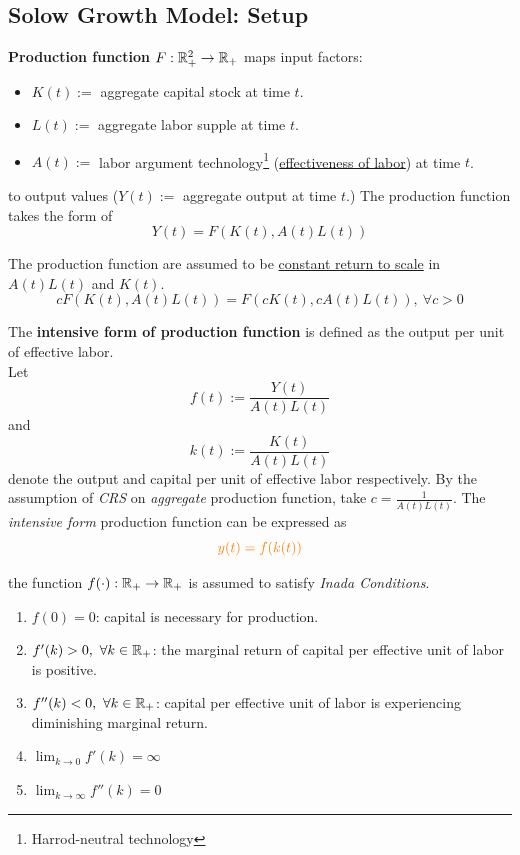 \documentclass[]{article}
\begin{document}
		\subsection{Solow Growth Model: Setup}
			\begin{definition}
				\textbf{Production function} $F: \mathbb{R}^2_{+} \rightarrow \mathbb{R}_+$ maps input factors:
				\begin{itemize}
					\item $K(t) := $ aggregate capital stock at time $t$.
					\item $L(t) := $ aggregate labor supple at time $t$.
					\item $A(t) := $ labor argument technology\footnote{Harrod-neutral technology} (\ul{effectiveness of labor}) at time $t$.
				\end{itemize} 
				to output values ($Y(t) := $ aggregate output at time $t$.) The production function takes the form of
				\[
					Y(t) = F(K(t), A(t)L(t))
				\]
			\end{definition}
			
			\begin{assumption}
				The production function are assumed to be \ul{constant return to scale} in $A(t)L(t)$ and $K(t)$.
				\[
					cF(K(t), A(t)L(t)) = F(cK(t), cA(t)L(t)),\ \forall c > 0
				\]
			\end{assumption}
			
			\begin{definition}
				The \textbf{intensive form of production function} is defined as the output per unit of effective labor. \\
				Let 
				\[
					f(t) := \frac{Y(t)}{A(t)L(t)}
				\] 
				and 
				\[
					k(t) := \frac{K(t)}{A(t)L(t)}
				\] denote the output and capital per unit of effective labor respectively. By the assumption of \emph{CRS} on \emph{aggregate} production function, take $c = \frac{1}{A(t)L(t)}$. The \emph{intensive form} production function can be expressed as
				\begin{equation}
					\textcolor{orange}{
						y(t) = f(k(t))
					}
				\end{equation}
			\end{definition}
			
			\begin{assumption} the function $f(\cdot): \mathbb{R}_+ \rightarrow \mathbb{R}_+$ is assumed to satisfy \emph{Inada Conditions}.
				\begin{enumerate}
					\item $f(0) = 0$: capital is necessary for production.
					\item $f'(k) > 0,\ \forall k \in \mathbb{R}_+$: the marginal return of capital per effective unit of labor is positive.
					\item $f''(k) < 0,\ \forall k \in \mathbb{R}_+$: capital per effective unit of labor is experiencing diminishing marginal return.
					\item $\lim_{k \to 0}f'(k) = \infty$
					\item $\lim_{k \to \infty}f''(k) = 0$
				\end{enumerate}
			\end{assumption}
			
\end{document}

